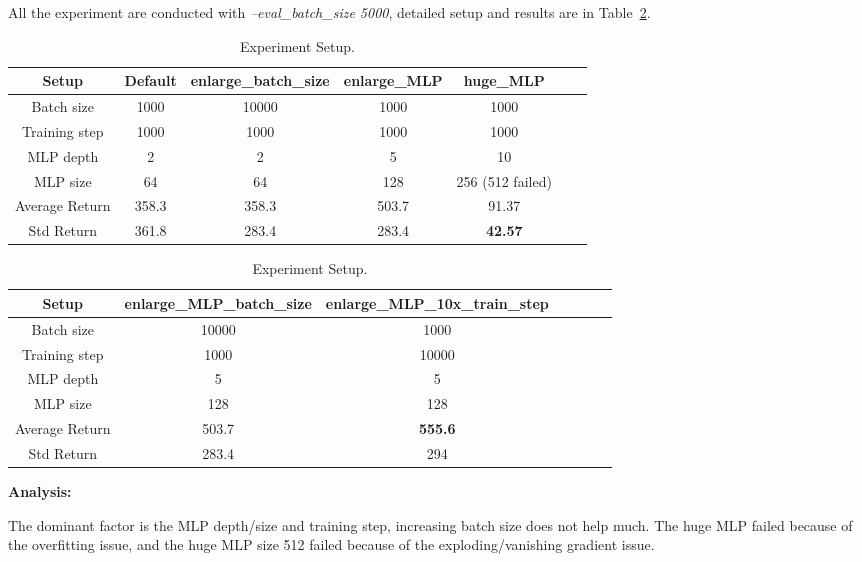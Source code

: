 \documentclass{article}
\newcommand{\tref}[1]{Table~\ref{#1}}
\begin{document}
All the experiment are conducted with \textit{--eval\_batch\_size 5000}, detailed setup and results are in \tref{tab:p4}.

\begin{table}[!h]
  \centering
  \begin{tabular}{c|cccccc}
    \toprule[1.0pt]
    Setup          & Default & enlarge\_batch\_size & enlarge\_MLP & huge\_MLP        \\
    \midrule
    Batch size     & 1000    & 10000                & 1000         & 1000             \\
    Training step  & 1000    & 1000                 & 1000         & 1000             \\
    MLP depth      & 2       & 2                    & 5            & 10               \\
    MLP size       & 64      & 64                   & 128          & 256 (512 failed) \\
    \midrule
    Average Return & 358.3   & 358.3                & 503.7        & 91.37            \\
    Std Return     & 361.8   & 283.4                & 283.4        & \textbf{42.57}   \\
    \bottomrule[1.0pt]
  \end{tabular}
  \begin{tabular}{c|cccccc}
    \toprule[1.0pt]
    Setup          & enlarge\_MLP\_batch\_size & enlarge\_MLP\_10x\_train\_step \\
    \midrule
    Batch size     & 10000                     & 1000                           \\
    Training step  & 1000                      & 10000                          \\
    MLP depth      & 5                         & 5                              \\
    MLP size       & 128                       & 128                            \\
    \midrule
    Average Return & 503.7                     & \textbf{555.6}                 \\
    Std Return     & 283.4                     & 294                            \\
    \bottomrule[1.0pt]
  \end{tabular}
  \caption{Experiment Setup.}
  \label{tab:p4}
\end{table}

\textbf{Analysis:}

The dominant factor is the MLP depth/size and training step, increasing batch size does not help much. The huge MLP failed because of the overfitting issue, and the huge MLP size 512 failed because of the exploding/vanishing gradient issue.
\end{document}
